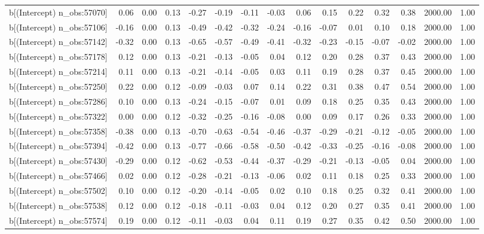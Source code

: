 \begin{table}[ht]
\begin{tabular}{rrrrrrrrrrrrrrr}
  b[(Intercept) n\_obs:57070] & 0.06 & 0.00 & 0.13 & -0.27 & -0.19 & -0.11 & -0.03 & 0.06 & 0.15 & 0.22 & 0.32 & 0.38 & 2000.00 & 1.00 \\ 
  b[(Intercept) n\_obs:57106] & -0.16 & 0.00 & 0.13 & -0.49 & -0.42 & -0.32 & -0.24 & -0.16 & -0.07 & 0.01 & 0.10 & 0.18 & 2000.00 & 1.00 \\ 
  b[(Intercept) n\_obs:57142] & -0.32 & 0.00 & 0.13 & -0.65 & -0.57 & -0.49 & -0.41 & -0.32 & -0.23 & -0.15 & -0.07 & -0.02 & 2000.00 & 1.00 \\ 
  b[(Intercept) n\_obs:57178] & 0.12 & 0.00 & 0.13 & -0.21 & -0.13 & -0.05 & 0.04 & 0.12 & 0.20 & 0.28 & 0.37 & 0.43 & 2000.00 & 1.00 \\ 
  b[(Intercept) n\_obs:57214] & 0.11 & 0.00 & 0.13 & -0.21 & -0.14 & -0.05 & 0.03 & 0.11 & 0.19 & 0.28 & 0.37 & 0.45 & 2000.00 & 1.00 \\ 
  b[(Intercept) n\_obs:57250] & 0.22 & 0.00 & 0.12 & -0.09 & -0.03 & 0.07 & 0.14 & 0.22 & 0.31 & 0.38 & 0.47 & 0.54 & 2000.00 & 1.00 \\ 
  b[(Intercept) n\_obs:57286] & 0.10 & 0.00 & 0.13 & -0.24 & -0.15 & -0.07 & 0.01 & 0.09 & 0.18 & 0.25 & 0.35 & 0.43 & 2000.00 & 1.00 \\ 
  b[(Intercept) n\_obs:57322] & 0.00 & 0.00 & 0.12 & -0.32 & -0.25 & -0.16 & -0.08 & 0.00 & 0.09 & 0.17 & 0.26 & 0.33 & 2000.00 & 1.00 \\ 
  b[(Intercept) n\_obs:57358] & -0.38 & 0.00 & 0.13 & -0.70 & -0.63 & -0.54 & -0.46 & -0.37 & -0.29 & -0.21 & -0.12 & -0.05 & 2000.00 & 1.00 \\ 
  b[(Intercept) n\_obs:57394] & -0.42 & 0.00 & 0.13 & -0.77 & -0.66 & -0.58 & -0.50 & -0.42 & -0.33 & -0.25 & -0.16 & -0.08 & 2000.00 & 1.00 \\ 
  b[(Intercept) n\_obs:57430] & -0.29 & 0.00 & 0.12 & -0.62 & -0.53 & -0.44 & -0.37 & -0.29 & -0.21 & -0.13 & -0.05 & 0.04 & 2000.00 & 1.00 \\ 
  b[(Intercept) n\_obs:57466] & 0.02 & 0.00 & 0.12 & -0.28 & -0.21 & -0.13 & -0.06 & 0.02 & 0.11 & 0.18 & 0.25 & 0.33 & 2000.00 & 1.00 \\ 
  b[(Intercept) n\_obs:57502] & 0.10 & 0.00 & 0.12 & -0.20 & -0.14 & -0.05 & 0.02 & 0.10 & 0.18 & 0.25 & 0.32 & 0.41 & 2000.00 & 1.00 \\ 
  b[(Intercept) n\_obs:57538] & 0.12 & 0.00 & 0.12 & -0.18 & -0.11 & -0.03 & 0.04 & 0.12 & 0.20 & 0.27 & 0.35 & 0.41 & 2000.00 & 1.00 \\ 
  b[(Intercept) n\_obs:57574] & 0.19 & 0.00 & 0.12 & -0.11 & -0.03 & 0.04 & 0.11 & 0.19 & 0.27 & 0.35 & 0.42 & 0.50 & 2000.00 & 1.00 \\ 

\end{tabular}
\end{table}
